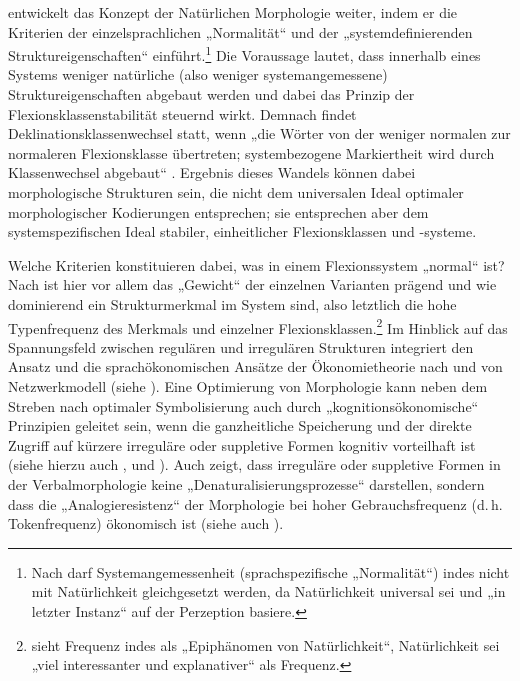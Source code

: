 \citet{Wurzel1984, Wurzel1994} entwickelt das Konzept der Natürlichen Morphologie weiter, indem er die Kriterien der einzelsprachlichen „Normalität“ und der „systemdefinierenden Struktureigenschaften“ einführt.\footnote{\textrm{Nach \citet[133--134]{Mayerthaler1981} darf Systemangemessenheit (sprachspezifische „Normalität“) indes nicht mit Natürlichkeit gleichgesetzt werden, da Natürlichkeit universal sei und „in letzter Instanz“ auf der Perzeption basiere.}} Die Voraussage lautet, dass innerhalb eines Systems weniger natürliche (also weniger systemangemessene) Struktureigenschaften abgebaut werden und dabei das Prinzip der Flexionsklassenstabilität steuernd wirkt. Demnach findet Deklinationsklassenwechsel statt, wenn „die Wörter von der weniger normalen zur normaleren Flexionsklasse übertreten; systembezogene Markiertheit wird durch Klassenwechsel abgebaut“ \citep[78]{Wurzel1984}. Ergebnis dieses Wandels können dabei morphologische Strukturen sein, die nicht dem universalen Ideal optimaler morphologischer Kodierungen entsprechen; sie entsprechen aber dem systemspezifischen Ideal stabiler, einheitlicher Flexionsklassen und -systeme.

Welche Kriterien konstituieren dabei, was in einem Flexionssystem „normal“ ist? Nach \citet[84--86]{Wurzel1984} ist hier vor allem das „Gewicht“ der einzelnen Varianten prägend und wie dominierend ein Strukturmerkmal im System sind, also letztlich die hohe Typenfrequenz des Merkmals und einzelner Flexionsklassen.\footnote{\textrm{\citet[140]{Mayerthaler1981} sieht Frequenz indes als} „Epiphänomen von Natürlichkeit“, Natürlichkeit sei „viel interessanter und explanativer“ als Frequenz.} Im Hinblick auf das Spannungsfeld zwischen regulären und irregulären Strukturen integriert \citet{Harnisch1988} den Ansatz  und die sprachökonomischen Ansätze der Ökonomietheorie nach  und von  Netzwerkmodell (siehe ). Eine Optimierung von Morphologie kann neben dem Streben nach optimaler Symbolisierung auch durch „kognitionsökonomische“ \citep[436]{Harnisch1988} Prinzipien geleitet sein, wenn die ganzheitliche Speicherung und der direkte Zugriff auf kürzere irreguläre oder suppletive Formen kognitiv vorteilhaft ist (siehe hierzu auch \citealt{Bittner1988}, \citealt{Harnisch1990} und \citealt{Ronneberger-Sibold1988}). Auch \citet[185--186]{Nübling2004} zeigt, dass irreguläre oder suppletive Formen in der Verbalmorphologie keine „Denaturalisierungsprozesse“ darstellen, sondern dass die „Analogieresistenz“ der Morphologie bei hoher Gebrauchsfrequenz (d.\,h. Tokenfrequenz) ökonomisch ist (siehe auch \citealt{Bybee1994}).

